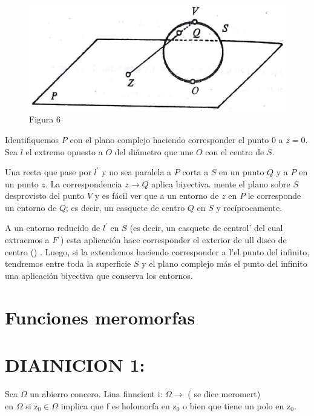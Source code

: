 \documentclass[10pt]{article}
\theoremstyle{plain}
\theoremstyle{definition}
\theoremstyle{remark}
\begin{document}
\begin{figure}[h]
\begin{center}
  \includegraphics[width=\textwidth]{2025_09_05_adecef5eb2053bc129b5g-085}
\captionsetup{labelformat=empty}
\caption{Figura 6}
\end{center}
\end{figure}

Identifiquemos $P$ con el plano complejo haciendo corresponder el punto 0 a $z=0$. Sea $l$ el extremo opuesto a $O$ del diámetro que une $O$ con el centro de $S$.

Una recta que pase por $l^{\prime}$ y no sea paralela a $P$ corta a $S$ en un punto $Q$ y a $P$ en un punto $z$. La correspondencia $z \rightarrow Q$ aplica biyectiva. mente el plano sobre $S$ desprovisto del punto $V$ y es fácil ver que a un entorno de $z$ en $P$ le corresponde un entorno de $Q$; es decir, un casquete de centro $Q$ en $S$ y recíprocamente.

A un entorno reducido de $l^{\prime}$ en $S$ (es decir, un casquete de centrol' del cual extraemos a $F$ ) esta aplicación hace corresponder el exterior de ull disco de centro () . Luego, si la extendemos haciendo corresponder a l'el punto del infinito, tendremos entre toda la superficie $S$ y el plano complejo más el punto del infinito una aplicación biyectiva que conserva los entornos.

\section{Funciones meromorfas}
\section*{DIAINICION 1:}
Sca $\Omega$ un abierro concero. Lina finncient i: $\Omega \rightarrow$ ( se dice meromert)\\
en $\Omega$ si $\mathrm{z}_{0} \in \Omega$ implica que f es holomorfa en $\mathrm{z}_{0}$ o bien que tiene un polo en $\mathrm{z}_{0}$.
\end{document}

